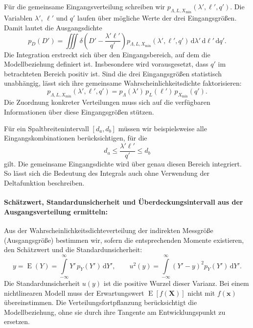 Für die gemeinsame Eingangsverteilung schreiben wir
$p_{\Lambda,L,X_{\mathrm{min}}}(\lambda',\ell',q')$.
Die Variablen $\lambda'$, $\ell'$ und $q'$ laufen über mögliche Werte
der drei Eingangsgrößen. Damit lautet die Ausgangsdichte
\begin{equation}
p_D(D')
=\iiint
\delta\!\left(D'-\frac{\lambda'\ell'}{q'}\right)
p_{\Lambda,L,X_{\mathrm{min}}}(\lambda',\ell',q')\,
\mathrm d\lambda'\,\mathrm d\ell'\,\mathrm dq'.
\label{eq:probCombinationSpalt}
\end{equation}
Die Integration erstreckt sich über den Eingangsbereich, auf dem
die Modellbeziehung definiert ist. Insbesondere wird vorausgesetzt,
dass $q'$ im betrachteten Bereich positiv ist.
Sind die drei Eingangsgrößen statistisch unabhängig,
lässt sich ihre gemeinsame Wahrscheinlichkeitsdichte faktorisieren:
\begin{equation}
p_{\Lambda,L,X_{\mathrm{min}}}(\lambda',\ell',q')
=
p_\Lambda(\lambda')\,p_L(\ell')\,
p_{X_{\mathrm{min}}}(q').
\end{equation}
Die Zuordnung konkreter Verteilungen muss sich auf die verfügbaren
Informationen über diese Eingangsgrößen stützen.

Für ein Spaltbreitenintervall $[d_a,d_b]$ müssen wir beispielsweise
alle Eingangskombinationen berücksichtigen, für die
\begin{equation}
d_a\leq\frac{\lambda'\ell'}{q'}\leq d_b
\end{equation}
gilt. Die gemeinsame Eingangsdichte wird über genau diesen Bereich
integriert. So lässt sich die Bedeutung des Integrals auch ohne
Verwendung der Deltafunktion beschreiben.

\paragraph{Schätzwert, Standardunsicherheit und Überdeckungsintervall aus der Ausgangsverteilung ermitteln:}

Aus der Wahrscheinlichkeitsdichteverteilung der indirekten Messgröße (Ausgangsgröße) bestimmen wir, sofern die entsprechenden Momente existieren, den Schätzwert und die Standardunsicherheit:
\begin{equation}
y=\operatorname E(Y)
=\int\limits_{-\infty}^{\infty}Y'\,p_Y(Y')\,\mathrm dY',
\qquad
u^2(y)
=\int\limits_{-\infty}^{\infty}(Y'-y)^2p_Y(Y')\,\mathrm dY'.
\end{equation}
Die Standardunsicherheit $u(y)$ ist die positive Wurzel dieser Varianz.
Bei einem nichtlinearen Modell muss der Erwartungswert
$\operatorname E[f(\mathbf X)]$ nicht mit $f(\mathbf x)$ übereinstimmen.
Die Verteilungsfortpflanzung berücksichtigt die Modellbeziehung,
ohne sie durch ihre Tangente am Entwicklungspunkt zu ersetzen.

